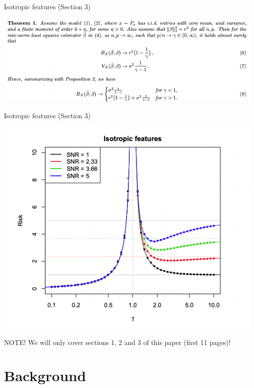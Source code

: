 \documentclass[english,aspectratio=1610]{beamer} %
\begin{document}
\begin{frame}{Isotropic features (Section 3)}
    \begin{center}
	\includegraphics[width=.8\linewidth]{figures/thm1.png}
    \end{center}
\end{frame}

\begin{frame}{Isotropic features (Section 3)}
    \begin{center}
	\includegraphics[width=.6\linewidth]{figures/fig1.png}
    \end{center}
\end{frame}

\begin{frame}{}
\begin{center}
\begin{block}{NOTE!}
        We will only cover sections 1, 2 and 3 of this paper (first 11 pages)!
\end{block}        
\end{center}
\end{frame}

\section{Background}
\end{document}
